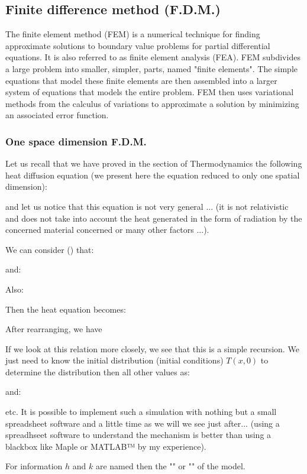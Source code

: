 	\pagebreak
	\subsection{Finite difference method (F.D.M.)}
	The finite element method (FEM) is a numerical technique for finding approximate solutions to boundary value problems for partial differential equations. It is also referred to as finite element analysis (FEA). FEM subdivides a large problem into smaller, simpler, parts, named "finite elements". The simple equations that model these finite elements are then assembled into a larger system of equations that models the entire problem. FEM then uses variational methods from the calculus of variations to approximate a solution by minimizing an associated error function.
	
	\subsubsection{One space dimension F.D.M.}\label{one space dimension fdm}
	Let us recall that we have proved in the section of Thermodynamics the following heat diffusion equation (we present here the equation reduced to only one spatial dimension):
	
	and let us notice that this equation is not very general ... (it is not relativistic and does not take into account the heat generated in the form of radiation by the concerned material concerned or many other factors ...).

	We can consider () that:
	
	and:
	
	Also:
	
	Then the heat equation becomes:
	
	After rearranging, we have
	
	If we look at this relation more closely, we see that this is a simple recursion. We just need to know the initial distribution (initial conditions) $T(x,0)$ to determine the distribution then all other values as:
	
	and:
	
	etc.
	It is possible to implement such a simulation with nothing but a small spreadsheet software and a little time as we will we see just after... (using a spreadhseet software to understand the mechanism is better than using a blackbox like Maple or MATLAB™ by my experience).

	For information $h$ and $k$ are named then the "" or "" of the model.
	
